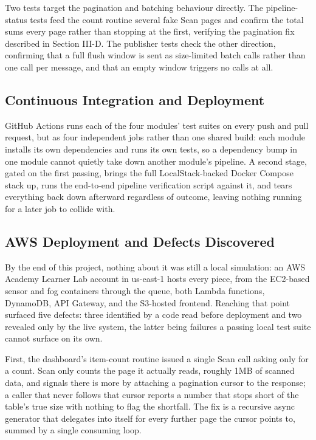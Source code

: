 \documentclass[conference]{IEEEtran}
\begin{document}
Two tests target the pagination and batching behaviour directly. The pipeline-status tests feed the count routine several fake Scan pages and confirm the total sums every page rather than stopping at the first, verifying the pagination fix described in Section III-D. The publisher tests check the other direction, confirming that a full flush window is sent as size-limited batch calls rather than one call per message, and that an empty window triggers no calls at all.

\subsection{Continuous Integration and Deployment}
GitHub Actions runs each of the four modules' test suites on every push and pull request, but as four independent jobs rather than one shared build: each module installs its own dependencies and runs its own tests, so a dependency bump in one module cannot quietly take down another module's pipeline. A second stage, gated on the first passing, brings the full LocalStack-backed Docker Compose stack up, runs the end-to-end pipeline verification script against it, and tears everything back down afterward regardless of outcome, leaving nothing running for a later job to collide with.

\subsection{AWS Deployment and Defects Discovered}
By the end of this project, nothing about it was still a local simulation: an AWS Academy Learner Lab account in us-east-1 hosts every piece, from the EC2-based sensor and fog containers through the queue, both Lambda functions, DynamoDB, API Gateway, and the S3-hosted frontend. Reaching that point surfaced five defects: three identified by a code read before deployment and two revealed only by the live system, the latter being failures a passing local test suite cannot surface on its own.

First, the dashboard's item-count routine issued a single Scan call asking only for a count. Scan only counts the page it actually reads, roughly 1MB of scanned data, and signals there is more by attaching a pagination cursor to the response; a caller that never follows that cursor reports a number that stops short of the table's true size with nothing to flag the shortfall. The fix is a recursive async generator that delegates into itself for every further page the cursor points to, summed by a single consuming loop.
\end{document}
